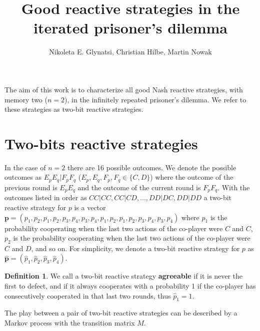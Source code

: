 \documentclass{article}
\title{Good reactive strategies in the iterated prisoner's dilemma}
\author{Nikoleta E. Glynatsi, Christian Hilbe, Martin Nowak}
\date{}
\theoremstyle{definition}
\newtheorem{definition}{Definition}[section]
\begin{document}
\maketitle

The aim of this work is to characterize all good Nash reactive strategies, with
memory two (\(n=2\)), in the infinitely repeated prisoner's dilemma. We refer to
these strategies as two-bit reactive strategies.

\section{Two-bits reactive strategies}

In the case of \(n=2\) there are 16 possible outcomes. We denote the possible
outcomes as \(E_p E_q | F_p F_q\) (\(E_p, E_q, F_p, F_q \in \{C, D\}\)) where
the outcome of the previous round is \(E_p E_q\) and the outcome of the current
round is \(F_p F_q\). With the outcomes listed in order as \(CC|CC, CC|CD,
\dots, DD|DC, DD|DD\)  a two-bit reactive strategy for \(p\) is a vector
\(\mathbf{p} = (p_1, p_2, p_1, p_2, p_3, p_4, p_3, p_4, p_1, p_2, p_1, p_2, p_3,
p_4, \allowbreak p_3, p_4)\) where \(p_1\) is the probability cooperating when
the last two actions of the co-player were \(C\) and \(C\), \(p_2\) is the
probability cooperating when the last two actions of the co-player were \(C\)
and \(D\), and so on. For simplicity, we denote a two-bit reactive strategy for
\(p\) as \(\mathbf{\hat{p}} = (\hat{p}_1, \hat{p}_2, \hat{p}_3, \hat{p}_4)\).

\begin{definition}
  We call a two-bit reactive strategy \textbf{agreeable} if it is never the
  first to defect, and if it always cooperates with a probability 1 if the
  co-player has consecutively cooperated in that last two rounds, thus \(\hat{p}_1=1\).
\end{definition}

The play between a pair of two-bit reactive strategies can be described by a
Markov process with the transition matrix \(M\).
\end{document}
